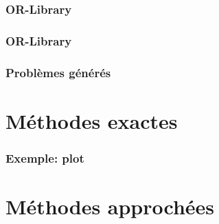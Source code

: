 \documentclass[aspectratio=169,11pt]{beamer}
\begin{document}
	\begin{frame}
		\frametitle{OR-Library}
		\centering\resizebox{0.85\linewidth}{!}{}
	\end{frame}
	\begin{frame}
		\frametitle{OR-Library}
		\hfill%
		\begin{minipage}{0.24\linewidth}
			\resizebox{\linewidth}{!}{}%
		\end{minipage}
		\hfill%
		\begin{minipage}{0.24\linewidth}
			\resizebox{\linewidth}{!}{}%
		\end{minipage}
		\hfill\hspace{0pt}
	\end{frame}
	\begin{frame}
		\frametitle{Problèmes générés}
		\hfill%
		\begin{minipage}{0.21\linewidth}
			\resizebox{\linewidth}{!}{}%
		\end{minipage}
		\hfill%
		\begin{minipage}{0.21\linewidth}
			\resizebox{\linewidth}{!}{}%
		\end{minipage}
		\hfill%
		\begin{minipage}{0.21\linewidth}
			\resizebox{\linewidth}{!}{}%
		\end{minipage}
		\hfill%
		\begin{minipage}{0.21\linewidth}
			\resizebox{\linewidth}{!}{}%
		\end{minipage}
		\hfill\hspace{0pt}
	\end{frame}

	\section{Méthodes exactes}

	\begin{frame}
		\frametitle{Exemple: plot}
		\centering
	\end{frame}

	\section{Méthodes approchées}
\end{document}
